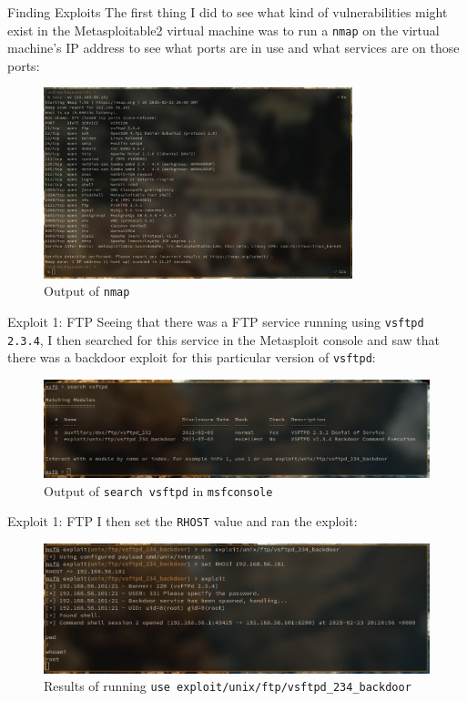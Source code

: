 \documentclass[]{beamer}
\begin{document}
\begin{frame}{Finding Exploits}
    The first thing I did to see what kind of vulnerabilities might exist in the Metasploitable2 virtual machine was to run a \texttt{nmap} on the virtual machine's IP address to see what ports are in use and what services are on those ports:

\begin{figure}[H]
    \centering
    \includegraphics[width=0.8\textwidth]{./images/nmap.png}
    \caption{Output of \texttt{nmap}}
\end{figure}
\end{frame}

\begin{frame}{Exploit 1: FTP}
    Seeing that there was a FTP service running using \texttt{vsftpd 2.3.4}, I then searched for this service in the Metasploit console and saw that there was a backdoor exploit for this particular version of \texttt{vsftpd}:

\begin{figure}[H]
    \centering
    \includegraphics[width=\textwidth]{./images/searchftp.png}
    \caption{Output of \texttt{search vsftpd} in \texttt{msfconsole}}
\end{figure}
\end{frame}

\begin{frame}{Exploit 1: FTP}
    I then set the \texttt{RHOST} value and ran the exploit:

\begin{figure}[H]
    \centering
    \includegraphics[width=\textwidth]{./images/ftpexploit.png}
    \caption{Results of running \texttt{use exploit/unix/ftp/vsftpd\_234\_backdoor}}
\end{figure}
\end{frame}
\end{document}
